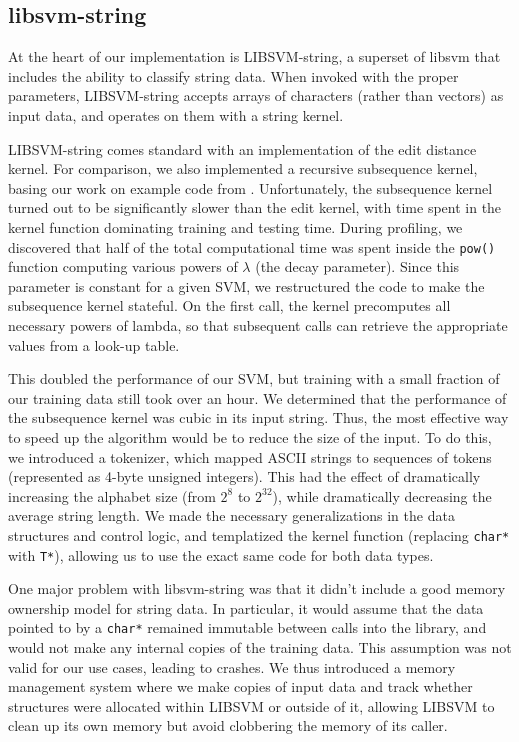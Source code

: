 \documentclass[10pt]{article}
\begin{document}
\begin{multicols}{2}
\subsection{libsvm-string}

At the heart of our implementation is LIBSVM-string, a superset of libsvm that includes the ability to classify string data. \cite{libsvm-string} When invoked with the proper parameters, LIBSVM-string accepts arrays of characters (rather than vectors) as input data, and operates on them with a string kernel.

LIBSVM-string comes standard with an implementation of the edit distance kernel. For comparison, we also implemented a recursive subsequence kernel, basing our work on example code from \cite{learning-kernel-classifiers}. Unfortunately, the subsequence kernel turned out to be significantly slower than the edit kernel, with time spent in the kernel function dominating training and testing time. During profiling, we discovered that half of the total computational time was spent inside the \texttt{pow()} function computing various powers of $\lambda$ (the decay parameter). Since this parameter is constant for a given SVM, we restructured the code to make the subsequence kernel stateful. On the first call, the kernel precomputes all necessary powers of lambda, so that subsequent calls can retrieve the appropriate values from a look-up table.

This doubled the performance of our SVM, but training with a small fraction of our training data still took over an hour. We determined that the performance of the subsequence kernel was cubic in its input string. Thus, the most effective way to speed up the algorithm would be to reduce the size of the input. To do this, we introduced a tokenizer, which mapped ASCII strings to sequences of tokens (represented as 4-byte unsigned integers). This had the effect of dramatically increasing the alphabet size (from $2^8$ to $2^{32}$), while dramatically decreasing the average string length. We made the necessary generalizations in the data structures and control logic, and templatized the kernel function (replacing \texttt{char*} with \texttt{T*}), allowing us to use the exact same code for both data types.

One major problem with libsvm-string was that it didn't include a good memory ownership model for string data. In particular, it would assume that the data pointed to by a \texttt{char*} remained immutable between calls into the library, and would not make any internal copies of the training data. This assumption was not valid for our use cases, leading to crashes. We thus introduced a memory management system where we make copies of input data and track whether structures were allocated within LIBSVM or outside of it, allowing LIBSVM to clean up its own memory but avoid clobbering the memory of its caller.


\end{multicols}
\end{document}
